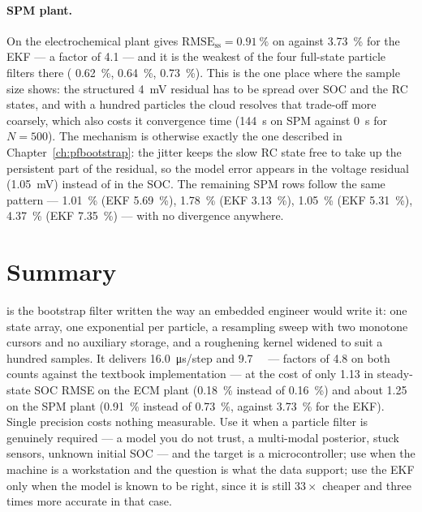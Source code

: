 \paragraph{SPM plant.}  On the electrochemical plant  gives
$\mathrm{RMSE}_{\mathrm{ss}} = \SI{0.91}{\percent}$ on  against \SI{3.73}{\percent}
for the EKF --- a factor of \num{4.1} --- and it is the weakest of the four full-state particle
filters there ( \SI{0.62}{\percent}, 
\SI{0.64}{\percent},  \SI{0.73}{\percent}).  This is the one place where the
sample size shows: the structured \SI{4}{\milli\volt} residual has to be spread over SOC and the
RC states, and with a hundred particles the cloud resolves that trade-off more coarsely, which also
costs it convergence time (\SI{144}{\second} on SPM  against \SI{0}{\second} for
$N=500$).  The mechanism is otherwise exactly the one described in Chapter~\ref{ch:pfbootstrap}:
the jitter keeps the slow RC state free to take up the persistent part of the residual, so the
model error appears in the voltage residual (\SI{1.05}{\milli\volt}) instead of in the SOC.  The
remaining SPM rows follow the same pattern ---  \SI{1.01}{\percent} (EKF
\SI{5.69}{\percent}),  \SI{1.78}{\percent} (EKF \SI{3.13}{\percent}),
 \SI{1.05}{\percent} (EKF \SI{5.31}{\percent}), 
\SI{4.37}{\percent} (EKF \SI{7.35}{\percent}) --- with no divergence anywhere.

\section{Summary}
 is the bootstrap filter written the way an embedded engineer would write it: one
state array, one exponential per particle, a resampling sweep with two monotone cursors and no
auxiliary storage, and a roughening kernel widened to suit a hundred samples.  It delivers
\SI{16.0}{\micro\second}/step and \SI{9.7}{\kilo\byte} --- factors of \num{4.8} on both counts
against the textbook implementation --- at the cost of only \num{1.13} in steady-state SOC RMSE on
the ECM plant (\SI{0.18}{\percent} instead of \SI{0.16}{\percent}) and about \num{1.25} on the SPM
plant (\SI{0.91}{\percent} instead of \SI{0.73}{\percent}, against \SI{3.73}{\percent} for the
EKF).  Single precision costs nothing measurable.  Use it when a particle filter is genuinely
required --- a model you do not trust, a multi-modal posterior, stuck sensors, unknown initial SOC
--- and the target is a microcontroller; use  when the machine is a
workstation and the question is what the data support; use the EKF only when the model is known to
be right, since it is still $33\times$ cheaper and three times more accurate in that case.
